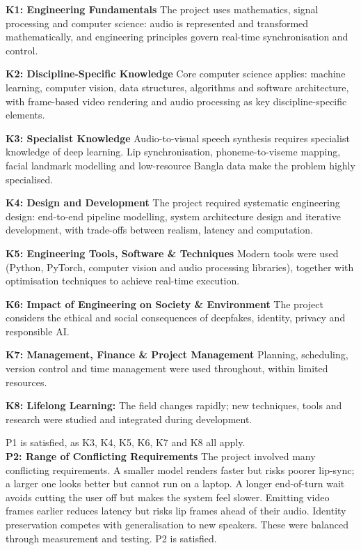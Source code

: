 \noindent
\textbf{K1: Engineering Fundamentals}
\noindent
The project uses mathematics, signal processing and computer science: audio is represented and transformed mathematically, and engineering principles govern real-time synchronisation and control.

\noindent
\textbf{K2: Discipline-Specific Knowledge}
\noindent
Core computer science applies: machine learning, computer vision, data structures, algorithms and software architecture, with frame-based video rendering and audio processing as key discipline-specific elements.

\noindent
\textbf{K3: Specialist Knowledge}
\noindent
Audio-to-visual speech synthesis requires specialist knowledge of deep learning. Lip synchronisation, phoneme-to-viseme mapping, facial landmark modelling and low-resource Bangla data make the problem highly specialised.

\noindent
\textbf{K4: Design and Development}
\noindent
The project required systematic engineering design: end-to-end pipeline modelling, system architecture design and iterative development, with trade-offs between realism, latency and computation.

\noindent
\textbf{K5: Engineering Tools, Software \& Techniques}
\noindent
Modern tools were used (Python, PyTorch, computer vision and audio processing libraries), together with optimisation techniques to achieve real-time execution.

\noindent
\textbf{K6: Impact of Engineering on Society \& Environment}
\noindent
The project considers the ethical and social consequences of deepfakes, identity, privacy and responsible AI.

\noindent
\textbf{K7: Management, Finance \& Project Management}
\noindent
Planning, scheduling, version control and time management were used throughout, within limited resources.

\noindent
\textbf{K8: Lifelong Learning:}
\noindent
The field changes rapidly; new techniques, tools and research were studied and integrated during development.

\vspace{1em}

\noindent
P1 is satisfied, as K3, K4, K5, K6, K7 and K8 all apply.\\

\noindent
\textbf{P2: Range of Conflicting Requirements}
\noindent
The project involved many conflicting requirements. A smaller model renders faster but risks poorer lip-sync; a larger one looks better but cannot run on a laptop. A longer end-of-turn wait avoids cutting the user off but makes the system feel slower. Emitting video frames earlier reduces latency but risks lip frames ahead of their audio. Identity preservation competes with generalisation to new speakers. These were balanced through measurement and testing. P2 is satisfied.

